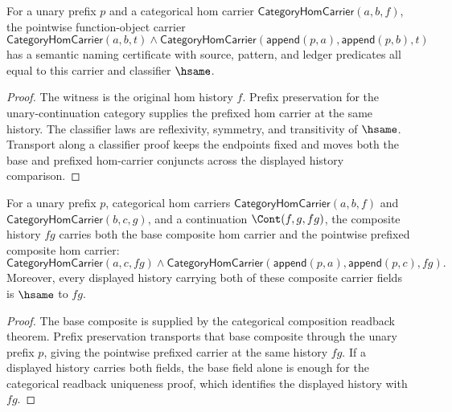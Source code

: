 \begin{theorem}
\label{thm:funcobj-pointwise-hom-carrier-semantic-namecert}
For a unary prefix $p$ and a categorical hom carrier
$\mathsf{CategoryHomCarrier}(a,b,f)$, the pointwise function-object carrier
$$
\mathsf{CategoryHomCarrier}(a,b,t)\wedge
\mathsf{CategoryHomCarrier}(\mathsf{append}(p,a),\mathsf{append}(p,b),t)
$$
has a semantic naming certificate with source, pattern, and ledger predicates
all equal to this carrier and classifier $\hsame$.
\end{theorem}
\begin{proof}
The witness is the original hom history $f$. Prefix preservation for the
unary-continuation category supplies the prefixed hom carrier at the same
history. The classifier laws are reflexivity, symmetry, and transitivity of
$\hsame$. Transport along a classifier proof keeps the endpoints fixed and
moves both the base and prefixed hom-carrier conjuncts across the displayed
history comparison.
\end{proof}

\begin{theorem}
\label{thm:funcobj-pointwise-hom-carrier-composition-readback}
For a unary prefix $p$, categorical hom carriers
$\mathsf{CategoryHomCarrier}(a,b,f)$ and
$\mathsf{CategoryHomCarrier}(b,c,g)$, and a continuation
$\Cont(f,g,fg)$, the composite history $fg$ carries both the base composite
hom carrier and the pointwise prefixed composite hom carrier:
$$
\mathsf{CategoryHomCarrier}(a,c,fg)\land
\mathsf{CategoryHomCarrier}(\mathsf{append}(p,a),\mathsf{append}(p,c),fg).
$$
Moreover, every displayed history carrying both of these composite carrier
fields is $\hsame$ to $fg$.
\end{theorem}
\begin{proof}
The base composite is supplied by the categorical composition readback theorem.
Prefix preservation transports that base composite through the unary prefix
$p$, giving the pointwise prefixed carrier at the same history $fg$. If a
displayed history carries both fields, the base field alone is enough for the
categorical readback uniqueness proof, which identifies the displayed history
with $fg$.
\end{proof}

